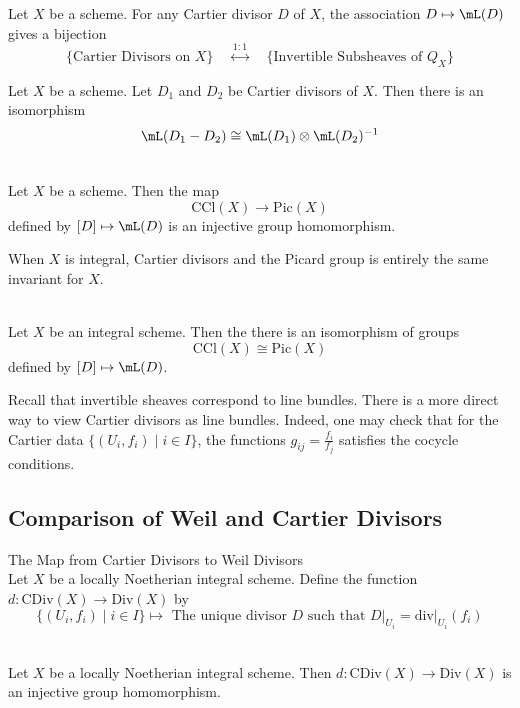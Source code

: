 \documentclass[a4paper]{article}
\begin{document}
\begin{thm}{}{} Let $X$ be a scheme. For any Cartier divisor $D$ of $X$, the association $D\mapsto\mL(D)$ gives a bijection $$\{\text{Cartier Divisors on }X\}\;\;\;\;\overset{1:1}{\longleftrightarrow}\;\;\;\;\{\text{Invertible Subsheaves of }Q_X\}$$
\end{thm}

\begin{prp}{}{} Let $X$ be a scheme. Let $D_1$ and $D_2$ be Cartier divisors of $X$. Then there is an isomorphism $$\mL(D_1-D_2)\cong\mL(D_1)\otimes\mL(D_2)^{-1}$$
\end{prp}

\begin{prp}{}{}\\
Let $X$ be a scheme. Then the map $$\text{CCl}(X)\to\text{Pic}(X)$$ defined by $[D]\mapsto\mL(D)$ is an injective group homomorphism. 
\end{prp}

When $X$ is integral, Cartier divisors and the Picard group is entirely the same invariant for $X$. 

\begin{prp}{}{}\\
Let $X$ be an integral scheme. Then the there is an isomorphism of groups $$\text{CCl}(X)\cong\text{Pic}(X)$$ defined by $[D]\mapsto\mL(D)$. 
\end{prp}

Recall that invertible sheaves correspond to line bundles. There is a more direct way to view Cartier divisors as line bundles. Indeed, one may check that for the Cartier data $\{(U_i,f_i)\;|\;i\in I\}$, the functions $g_{ij}=\frac{f_i}{f_j}$ satisfies the cocycle conditions. 

\subsection{Comparison of Weil and Cartier Divisors}
\begin{defn}{The Map from Cartier Divisors to Weil Divisors}{}\\
Let $X$ be a locally Noetherian integral scheme. Define the function $d:\text{CDiv}(X)\to\text{Div}(X)$ by $$\{(U_i,f_i)\;|\;i\in I\}\mapsto\text{ The unique divisor }D\text{ such that }D|_{U_i}=\text{div}|_{U_i}(f_i)$$
\end{defn}

\begin{prp}{}{}\\
Let $X$ be a locally Noetherian integral scheme. Then $d:\text{CDiv}(X)\to\text{Div}(X)$ is an injective group homomorphism. 
\end{prp}
\end{document}
